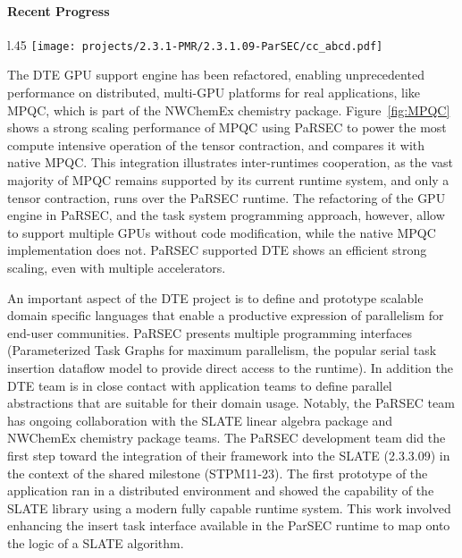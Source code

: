 \paragraph{Recent Progress}

\begin{wrapfigure}{l}{.45\linewidth}
  \centering\texttt{[image: projects/2.3.1-PMR/2.3.1.09-ParSEC/cc\_abcd.pdf]}
  \caption{Strong-scaling performance of the ABCD term in the coupled-cluster doubles equation for $(H_2O)_{12}$ in aug-cc-pVDZ basis set.\label{fig:MPQC}}
\end{wrapfigure}
The DTE GPU support engine has been refactored, enabling unprecedented
performance on distributed, multi-GPU platforms for real applications,
like MPQC, which is part of the NWChemEx chemistry
package. Figure~\ref{fig:MPQC} shows a strong scaling performance of
MPQC using PaRSEC to power the most compute intensive operation of the
tensor contraction, and compares it with native MPQC. This
integration illustrates inter-runtimes cooperation, as the
vast majority of MPQC remains supported by its current runtime
system, and only a tensor contraction, runs over
the PaRSEC runtime.
The refactoring of the GPU engine in PaRSEC, and the task system programming
approach, however, allow to support multiple GPUs without code modification,
while the native MPQC implementation does not. PaRSEC supported DTE shows an
efficient strong scaling, even with multiple accelerators.

An important aspect of the DTE project is to define and prototype scalable
domain specific languages that enable a productive expression of parallelism for
end-user communities. PaRSEC presents multiple programming interfaces
(Parameterized Task Graphs for maximum parallelism, the popular serial task
insertion dataflow model to provide direct access to the runtime). In addition
the DTE team is in close contact with application teams to define parallel
abstractions that are suitable for their domain usage. Notably, the PaRSEC team
has ongoing collaboration with the SLATE linear algebra package and NWChemEx
chemistry package teams.
The PaRSEC development team did the first step toward the integration
of their framework into the SLATE (2.3.3.09) in the context of the
shared milestone (STPM11-23). The first prototype of the application
ran in a distributed environment and showed the capability of the
SLATE library using a modern fully capable runtime system. This work
involved enhancing the insert task interface available in the ParSEC
runtime to map onto the logic of a SLATE algorithm.

